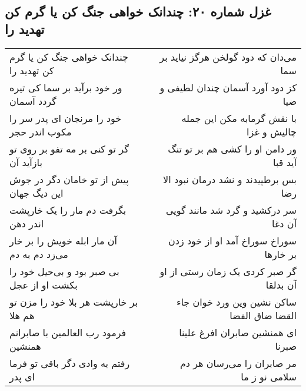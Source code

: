 \begin{center}
\section*{غزل شماره ۲۰: چندانک خواهی جنگ کن یا گرم کن تهدید را}
\label{sec:0020}
\begin{longtable}{l p{0.5cm} r}
چندانک خواهی جنگ کن یا گرم کن تهدید را
&&
می‌دان که دود گولخن هرگز نیاید بر سما
\\
ور خود برآید بر سما کی تیره گردد آسمان
&&
کز دود آورد آسمان چندان لطیفی و ضیا
\\
خود را مرنجان ای پدر سر را مکوب اندر حجر
&&
با نقش گرمابه مکن این جمله چالیش و غزا
\\
گر تو کنی بر مه تفو بر روی تو بازآید آن
&&
ور دامن او را کشی هم بر تو تنگ آید قبا
\\
پیش از تو خامان دگر در جوش این دیگ جهان
&&
بس برطپیدند و نشد درمان نبود الا رضا
\\
بگرفت دم مار را یک خارپشت اندر دهن
&&
سر درکشید و گرد شد مانند گویی آن دغا
\\
آن مار ابله خویش را بر خار می‌زد دم به دم
&&
سوراخ سوراخ آمد او از خود زدن بر خارها
\\
بی صبر بود و بی‌حیل خود را بکشت او از عجل
&&
گر صبر کردی یک زمان رستی از او آن بدلقا
\\
بر خارپشت هر بلا خود را مزن تو هم هلا
&&
ساکن نشین وین ورد خوان جاء القضا ضاق الفضا
\\
فرمود رب العالمین با صابرانم همنشین
&&
ای همنشین صابران افرغ علینا صبرنا
\\
رفتم به وادی دگر باقی تو فرما ای پدر
&&
مر صابران را می‌رسان هر دم سلامی نو ز ما
\\
\end{longtable}
\end{center}
